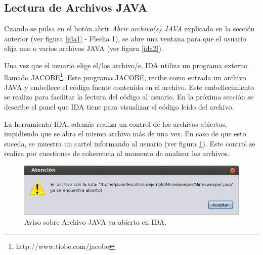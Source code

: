 \vspace{-1em}

\subsection{Lectura de Archivos JAVA}

Cuando se pulsa en el botón abrir \textit{Abrir archivo(s) JAVA} explicado en la sección anterior (ver figura \ref{ida1} - Flecha 1), se abre una ventana para que el usuario elija uno o varios archivos JAVA (ver figura \ref{ida2}). 


Una vez que el usuario elige el/los archivo/s, IDA utiliza un  programa externo llamado JACOBE\footnote[1]{http://www.tiobe.com/jacobe}. Este programa JACOBE, recibe como entrada un archivo JAVA y embellece el código fuente contenido en el archivo. Este embellecimiento se realiza para facilitar la lectura del código al usuario. En la próxima sección se describe el panel que IDA tiene para visualizar el código leído del archivo.


La herramienta IDA, además realiza un control de los archivos abiertos, impidiendo que se abra el mismo archivo más de una vez. En caso de que esto suceda, se muestra un cartel informando al usuario (ver figura \ref{idaWar2}). Este control se realiza por cuestiones de coherencia al momento de analizar los archivos.


\begin{figure}[t] %
\centerline{%
\includegraphics[scale= 0.8]{./cap4/ida_war_02.png}
}
\caption{Aviso sobre Archivo JAVA ya abierto en IDA.}
\label{idaWar2}
\end{figure}

